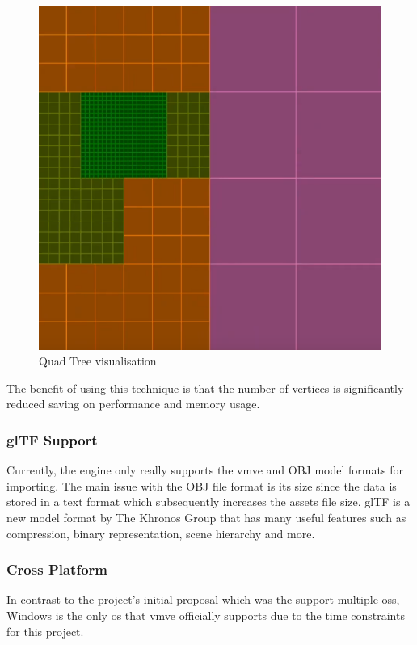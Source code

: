 \documentclass[11pt]{article}
\begin{document}
\begin{figure}[H]
  \centering
  \includegraphics[width=\textwidth]{images/quad_tree.png}
  \caption{Quad Tree visualisation}
  \label{fig:quad_tree}
\end{figure}

The benefit of using this technique is that the number of vertices is
significantly reduced saving on performance and memory usage.


\subsubsection{glTF Support}
Currently, the engine only really supports the \gls*{vmve} and OBJ model formats for
importing. The main issue with the OBJ file format is its size since the data is
stored in a text format which subsequently increases the assets file size. glTF
\cite{gltf} is a new model format by The Khronos Group that has many useful
features such as compression, binary representation, scene hierarchy and more.

\subsubsection{Cross Platform}
In contrast to the project's initial proposal which was the support multiple
\glspl*{os}, Windows is the only \gls*{os} that \gls*{vmve} officially supports due
to the time constraints for this project. 
\end{document}
